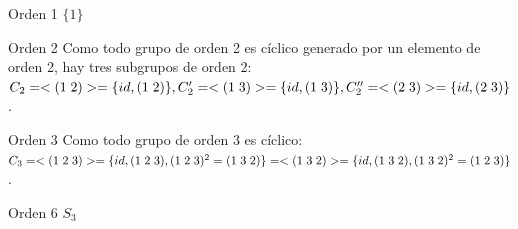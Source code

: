 \documentclass[11pt,a4paper]{article}
\begin{document}
\begin{enumerate*}
\item[Orden 1] $\{1\}$
\item[Orden 2] Como todo grupo de orden 2 es cíclico generado por un elemento de orden 2, hay tres subgrupos de orden 2: $C_{2} = <(1 \hspace{0.1cm} 2)> = \{id, (1 \hspace{0.1cm} 2)\}, \\ C'_{2} = <(1 \hspace{0.1cm} 3)> = \{id, (1 \hspace{0.1cm} 3)\}, C''_{2} = <(2 \hspace{0.1cm} 3)> = \{id, (2 \hspace{0.1cm} 3)\}$.
\item[Orden 3] Como todo grupo de orden 3 es cíclico: $C_{3} = <(1 \hspace{0.1cm} 2 \hspace{0.1cm} 3)> = \{id, (1 \hspace{0.1cm} 2 \hspace{0.1cm} 3), \\ (1 \hspace{0.1cm} 2 \hspace{0.1cm} 3)^{2} = (1 \hspace{0.1cm} 3 \hspace{0.1cm} 2)\} = <(1 \hspace{0.1cm} 3 \hspace{0.1cm} 2)> = \{id, (1 \hspace{0.1cm} 3 \hspace{0.1cm} 2), (1 \hspace{0.1cm} 3 \hspace{0.1cm} 2)^{2} = (1 \hspace{0.1cm} 2 \hspace{0.1cm} 3)\}$.
\item[Orden 6] $S_{3}$
\end{enumerate*}
\end{document}

